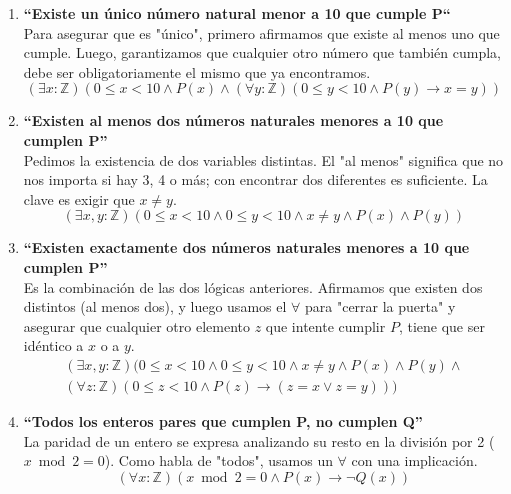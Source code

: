 \begin{enumerate}[label=\textbf{\alph*)}]

    \item \textbf{“Existe un único número natural menor a 10 que cumple P“} \\
    Para asegurar que es "único", primero afirmamos que existe al menos uno que cumple. Luego, garantizamos que cualquier otro número que también cumpla, debe ser obligatoriamente el mismo que ya encontramos.
    \[ (\exists x: \mathbb{Z})(0 \leq x < 10 \wedge P(x) \wedge (\forall y: \mathbb{Z})(0 \leq y < 10 \wedge P(y) \rightarrow x = y)) \]

    \vspace{0.4cm}
    \item \textbf{“Existen al menos dos números naturales menores a 10 que cumplen P”} \\
    Pedimos la existencia de dos variables distintas. El "al menos" significa que no nos importa si hay 3, 4 o más; con encontrar dos diferentes es suficiente. La clave es exigir que $x \neq y$.
    \[ (\exists x, y: \mathbb{Z})(0 \leq x < 10 \wedge 0 \leq y < 10 \wedge x \neq y \wedge P(x) \wedge P(y)) \]

    \vspace{0.4cm}
    \item \textbf{“Existen exactamente dos números naturales menores a 10 que cumplen P”} \\
    Es la combinación de las dos lógicas anteriores. Afirmamos que existen dos distintos (al menos dos), y luego usamos el $\forall$ para "cerrar la puerta" y asegurar que cualquier otro elemento $z$ que intente cumplir $P$, tiene que ser idéntico a $x$ o a $y$.
    \begin{multline*}
    (\exists x, y: \mathbb{Z})(0 \leq x < 10 \wedge 0 \leq y < 10 \wedge x \neq y \wedge P(x) \wedge P(y) \wedge \\
    (\forall z: \mathbb{Z})(0 \leq z < 10 \wedge P(z) \rightarrow (z = x \vee z = y)))
    \end{multline*}

    \vspace{0.4cm}
    \item \textbf{“Todos los enteros pares que cumplen P, no cumplen Q”} \\
    La paridad de un entero se expresa analizando su resto en la división por 2 ($x \bmod 2 = 0$). Como habla de "todos", usamos un $\forall$ con una implicación.
    \[ (\forall x: \mathbb{Z})(x \bmod 2 = 0 \wedge P(x) \rightarrow \neg Q(x)) \]


\end{enumerate}
